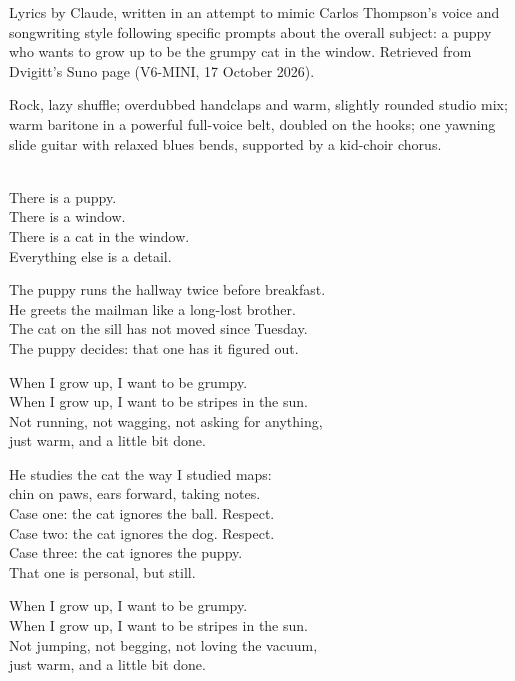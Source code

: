 
\label{sec:window-seat}
\begin{notes}
Lyrics by Claude, written in an attempt to mimic Carlos Thompson's voice and songwriting style following specific prompts about the overall subject: a puppy who wants to grow up to be the grumpy cat in the window. Retrieved from Dvigitt's Suno page (V6-MINI, 17 October 2026).
\end{notes}
\begin{style}
Rock, lazy shuffle; overdubbed handclaps and warm, slightly rounded studio mix; warm baritone in a powerful full-voice belt, doubled on the hooks; one yawning slide guitar with relaxed blues bends, supported by a kid-choir chorus.
\end{style}
\begin{lyrics}
\\
There is a puppy.\\
There is a window.\\
There is a cat in the window.\\
Everything else is a detail.

The puppy runs the hallway twice before breakfast.\\
He greets the mailman like a long-lost brother.\\
The cat on the sill has not moved since Tuesday.\\
The puppy decides: that one has it figured out.

When I grow up, I want to be grumpy.\\
When I grow up, I want to be stripes in the sun.\\
Not running, not wagging, not asking for anything,\\
just warm, and a little bit done.

He studies the cat the way I studied maps:\\
chin on paws, ears forward, taking notes.\\
Case one: the cat ignores the ball. Respect.\\
Case two: the cat ignores the dog. Respect.\\
Case three: the cat ignores the puppy.\\
That one is personal, but still.

When I grow up, I want to be grumpy.\\
When I grow up, I want to be stripes in the sun.\\
Not jumping, not begging, not loving the vacuum,\\
just warm, and a little bit done.


\end{lyrics}
